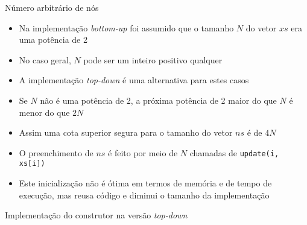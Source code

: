 \begin{frame}[fragile]{Número arbitrário de nós}

    \begin{itemize}
        \item Na implementação \textit{bottom-up} foi assumido que o tamanho $N$ do vetor
            $xs$ era uma potência de 2

        \item No caso geral, $N$ pode ser um inteiro positivo qualquer

        \item A implementação \textit{top-down} é uma alternativa para estes casos

        \item Se $N$ não é uma potência de 2, a próxima potência de 2 maior do que $N$ é menor
            do que $2N$

        \item Assim uma cota superior segura para o tamanho do vetor $ns$ é de $4N$

        \item O preenchimento de $ns$ é feito por meio de $N$ chamadas de \texttt{update(i, xs[i])}

        \item Este inicialização não é ótima em termos de memória e de tempo de execução, mas reusa
            código e diminui o tamanho da implementação

    \end{itemize}

\end{frame}

\begin{frame}[fragile]{Implementação do construtor na versão {\it top-down}}
\end{frame}


